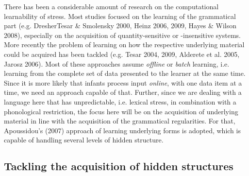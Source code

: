\documentclass[a4paper]{article}
\begin{document}
There has been a considerable amount of research on the computational learnability of stress. Most studies focused on the learning of the grammatical part (e.g. {Dresher}Tesar \& Smolensky 2000, Heinz 2006, 2009, Hayes \& Wilson 2008), especially on the acquisition of quantity-sensitive or -insensitive systems. More recently the problem of learning on how the respective underlying material could be acquired has been tackled (e.g. Tesar 2004, 2009, Alderete et al. 2005, Jarosz 2006). Most of these approaches assume \textit{offline} or \textit{batch} learning, i.e. learning from the complete set of data presented to the learner at the same time. Since it is more likely that infants process input \textit{online}, with one data item at a time, we need an approach capable of that. Further, since we are dealing with a language here that has unpredictable, i.e. lexical stress, in combination with a phonological restriction, the focus here will be on the acquisition of underlying material in line with the acquisition of the grammatical regularities. For that, Apoussidou’s (2007) approach of learning underlying forms is adopted, which is capable of handling several levels of hidden structure.

\subsection{
Tackling the acquisition of hidden structures}
\end{document}
